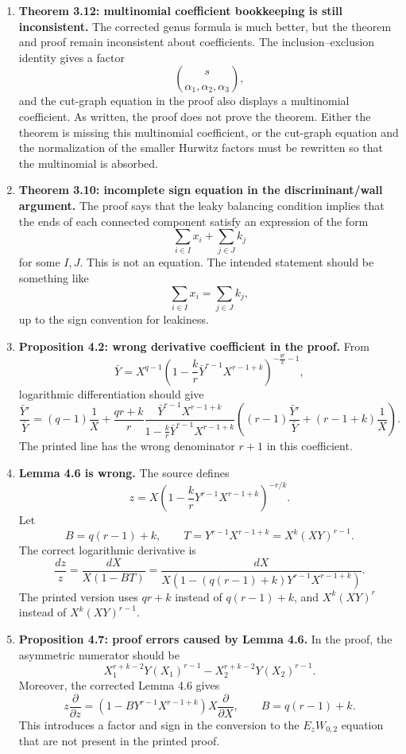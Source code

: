\documentclass[11pt]{article}
\begin{document}
\begin{enumerate}[label=\textbf{\arabic*.}]
   \item \textbf{Theorem 3.12: multinomial coefficient bookkeeping is still inconsistent.}
   The corrected genus formula is much better, but the theorem and proof remain inconsistent about coefficients.  The inclusion--exclusion identity gives a factor
   \[
      \binom{s}{\alpha_1,\alpha_2,\alpha_3},
   \]
   and the cut-graph equation in the proof also displays a multinomial coefficient.  As written, the proof does not prove the theorem.  Either the theorem is missing this multinomial coefficient, or the cut-graph equation and the normalization of the smaller Hurwitz factors must be rewritten so that the multinomial is absorbed.

   \item \textbf{Theorem 3.10: incomplete sign equation in the discriminant/wall argument.}
   The proof says that the leaky balancing condition implies that the ends of each connected component satisfy an expression of the form
   \[
      \sum_{i\in I}x_i+\sum_{j\in J}k_j
   \]
   for some $I,J$.  This is not an equation.  The intended statement should be something like
   \[
      \sum_{i\in I}x_i=\sum_{j\in J}k_j,
   \]
   up to the sign convention for leakiness.

   \item \textbf{Proposition 4.2: wrong derivative coefficient in the proof.}
   From
   \[
      \bar Y
      =
      X^{q-1}
      \left(
      1-\frac{k}{r}\bar Y^{r-1}X^{r-1+k}
      \right)^{-\frac{qr}{k}-1},
   \]
   logarithmic differentiation should give
   \[
      \frac{\bar Y'}{\bar Y}
      =
      (q-1)\frac1X
      +
      \frac{qr+k}{r}
      \frac{\bar Y^{r-1}X^{r-1+k}}
      {1-\frac{k}{r}\bar Y^{r-1}X^{r-1+k}}
      \left(
      (r-1)\frac{\bar Y'}{\bar Y}
      +
      (r-1+k)\frac1X
      \right).
   \]
   The printed line has the wrong denominator $r+1$ in this coefficient.

   \item \textbf{Lemma 4.6 is wrong.}
   The source defines
   \[
      z
      =
      X\left(
      1-\frac{k}{r}Y^{r-1}X^{r-1+k}
      \right)^{-r/k}.
   \]
   Let
   \[
      B=q(r-1)+k,
      \qquad
      T=Y^{r-1}X^{r-1+k}=X^k(XY)^{r-1}.
   \]
   The correct logarithmic derivative is
   \[
      \frac{dz}{z}
      =
      \frac{dX}{X(1-BT)}
      =
      \frac{dX}
      {X\left(1-(q(r-1)+k)Y^{r-1}X^{r-1+k}\right)}.
   \]
   The printed version uses $qr+k$ instead of $q(r-1)+k$, and $X^k(XY)^r$ instead of $X^k(XY)^{r-1}$.

   \item \textbf{Proposition 4.7: proof errors caused by Lemma 4.6.}
   In the proof, the asymmetric numerator should be
   \[
      X_1^{r+k-2}Y(X_1)^{r-1}
      -
      X_2^{r+k-2}Y(X_2)^{r-1}.
   \]
   Moreover, the corrected Lemma 4.6 gives
   \[
      z\frac{\partial}{\partial z}
      =
      \left(1-BY^{r-1}X^{r-1+k}\right)
      X\frac{\partial}{\partial X},
      \qquad
      B=q(r-1)+k.
   \]
   This introduces a factor and sign in the conversion to the $E_zW_{0,2}$ equation that are not present in the printed proof.


\end{enumerate}
\end{document}
